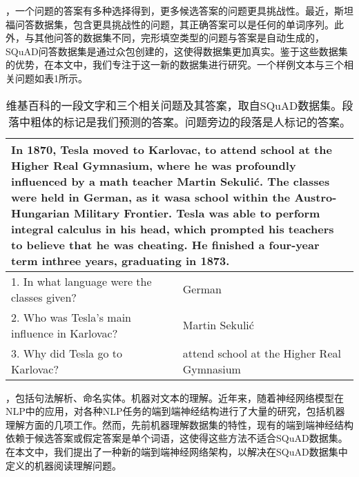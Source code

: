 \documentclass{article}
\begin{document}
\begin{CJK*}{UTF8}{gbsn}
        ，一个问题的答案有多种选择得到，更多候选答案的问题更具挑战性。最近，斯坦福问答数据集，包含更具挑战性的问题，其正确答案可以是任何的单词序列。此外，与其他问答的数据集不同，完形填空类型的问题与答案是自动生成的，SQuAD问答数据集是通过众包创建的，这使得数据集更加真实。鉴于这些数据集的优势，在本文中，我们专注于这一新的数据集进行研究。一个样例文本与三个相关问题如表1所示。

        \begin{table}[!htbp]
            \caption{维基百科的一段文字和三个相关问题及其答案，取自SQuAD数据集。段落中粗体的标记是我们预测的答案。问题旁边的段落是人标记的答案。}
            
            \centering
            \begin{tabular}{p{6cm}p{6cm}}
                \hline
                \multicolumn{2}{p{12cm}}{In 1870, Tesla moved to Karlovac, \textbf{to attend school at the Higher Real Gymnasium}, where he was profoundly influenced by a math teacher \textbf{Martin Sekulić}. The classes were held in \textbf{German}, as it wasa school within the Austro-Hungarian Military Frontier. Tesla was able to perform integral calculus in his head, which prompted his teachers to believe that he was cheating. He finished a four-year term inthree years, graduating in 1873.} \\
                \hline
                
                1. In what language were the classes given? & German \\
                2. Who was Tesla’s main influence in Karlovac? & Martin Sekulić \\
                3. Why did Tesla go to Karlovac? & attend school at the Higher Real Gymnasium \\
                \hline

            \end{tabular}
        \end{table}
        
        \vspace{1ex}        
        ，包括句法解析、命名实体。机器对文本的理解。近年来，随着神经网络模型在NLP中的应用，对各种NLP任务的端到端神经结构进行了大量的研究，包括机器理解方面的几项工作。然而，先前机器理解数据集的特性，现有的端到端神经结构依赖于候选答案或假定答案是单个词语，这使得这些方法不适合SQuAD数据集。在本文中，我们提出了一种新的端到端神经网络架构，以解决在SQuAD数据集中定义的机器阅读理解问题。


\end{CJK*}
\end{document}

